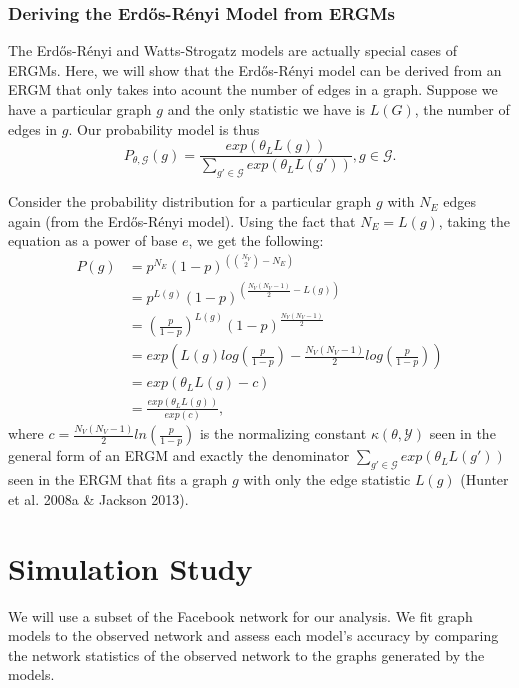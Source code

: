 \documentclass[12pt,twoside]{amherstthesis}
\begin{document}
  \subsection{Deriving the Erdős-Rényi Model from
  ERGMs}\label{deriving-the-erdos-renyi-model-from-ergms}
  
  The Erdős-Rényi and Watts-Strogatz models are actually special cases of
  ERGMs. Here, we will show that the Erdős-Rényi model can be derived from
  an ERGM that only takes into acount the number of edges in a graph.
  Suppose we have a particular graph \(g\) and the only statistic we have
  is \(L(G)\), the number of edges in \(g\). Our probability model is thus
  \[P_{\theta, \mathcal{G}}(g) = \frac {exp(\theta_{L}L(g))} {\sum_{g' \in \mathcal{G}}^{} exp(\theta_{L}L(g'))}, g \in \mathcal{G}.\]
  
  Consider the probability distribution for a particular graph \(g\) with
  \(N_E\) edges again (from the Erdős-Rényi model). Using the fact that
  \(N_{E} = L(g)\), taking the equation as a power of base \(e\), we get
  the following: \[
  \begin{aligned}
  P(g) &= p^{N_E}(1 - p)^{\left({N_V \choose 2} - N_E \right)} \\
  &= p^{L(g)}(1 - p)^{\left(\frac {N_{V}(N_{V} - 1)} {2} - L(g) \right)} \\
  &= \left( \frac {p} {1-p} \right)^{L(g)}(1 - p)^{\frac {N_{V}(N_{V} - 1)} {2}} \\
  &= exp \left(L(g)log \left(\frac {p} {1-p} \right) - \frac {N_{V}(N_{V} - 1)} {2} log \left( \frac {p} {1-p} \right) \right) \\
  &= exp(\theta_{L}L(g) - c) \\
  &= \frac {exp(\theta_{L}L(g))} {exp(c)},
  \end{aligned} 
  \] where
  \(c = \frac {N_{V}(N_{V} - 1)} {2} ln \left( \frac {p} {1-p} \right)\)
  is the normalizing constant \(\kappa(\theta, \mathcal{Y})\) seen in the
  general form of an ERGM and exactly the denominator
  \(\sum_{g' \in \mathcal{G}}^{} exp(\theta_{L}L(g'))\) seen in the ERGM
  that fits a graph \(g\) with only the edge statistic \(L(g)\) (Hunter et
  al. 2008a \& Jackson 2013).
  
  \chapter{Simulation Study}\label{simulation-study}
  
  We will use a subset of the Facebook network for our analysis. We fit
  graph models to the observed network and assess each model's accuracy by
  comparing the network statistics of the observed network to the graphs
  generated by the models.
  
\end{document}
